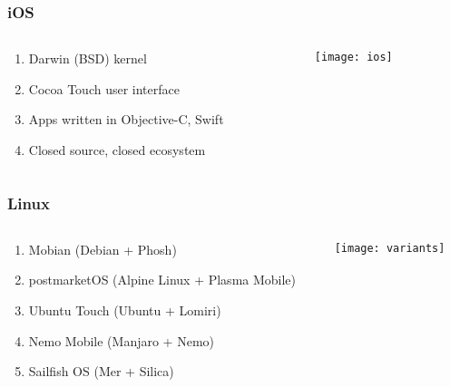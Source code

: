 \documentclass[
	notes=none,
	aspectratio=169
]{beamer}
\begin{document}

\begin{frame}
\frametitle{iOS}

\begin{columns}[T]
\begin{column}[T]{0.5\textwidth}
\setlength{\parskip}{0.5em}

\vspace{1.7cm}
\begin{enumerate}
\setlength{\parskip}{0.5em}
\item Darwin (BSD) kernel
\item Cocoa Touch user interface
\item Apps written in Objective-C, Swift
\item Closed source, closed ecosystem
\end{enumerate}

\end{column}

\begin{column}[T]{0.5\textwidth}

\vspace{1.0cm}
\hspace{1.54em}\texttt{[image: ios]}

\end{column}
\end{columns}

\end{frame}
\note{
}


\begin{frame}
\frametitle{Linux}

\begin{columns}[T]
\begin{column}[T]{0.65\textwidth}
\setlength{\parskip}{0.5em}

\vspace{1.0cm}
\begin{enumerate}
\setlength{\parskip}{0.5em}
\item Mobian (Debian + Phosh)
\item postmarketOS (Alpine Linux + Plasma Mobile)
\item Ubuntu Touch (Ubuntu + Lomiri)
\item Nemo Mobile (Manjaro + Nemo)
\item Sailfish OS (Mer + Silica)
\end{enumerate}

\end{column}
\begin{column}[T]{0.35\textwidth}

\vspace{0.0cm}
\texttt{[image: variants]}

\end{column}
\end{columns}

\end{frame}
\note{
}
\end{document}
